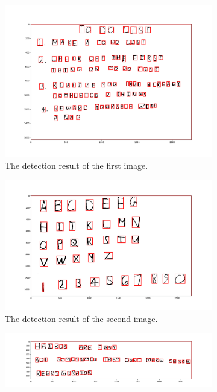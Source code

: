 \documentclass[11pt]{article}
\begin{document}
\begin{figure}[h!]
    \begin{subfigure}{.495\textwidth}
      \centering
      \includegraphics[width=.9\linewidth]{../results/q4_3_1.png}
      \caption{The detection result of the first image. }
    \end{subfigure}
    \begin{subfigure}{.495\textwidth}
      \centering
      \includegraphics[width=.9\linewidth]{../results/q4_3_2.png}
      \caption{The detection result of the second image. }
    \end{subfigure}\hfill
    \begin{subfigure}{.495\textwidth}
      \centering
      \includegraphics[width=.9\linewidth]{../results/q4_3_3.png}

\end{subfigure}
\end{figure}
\end{document}
